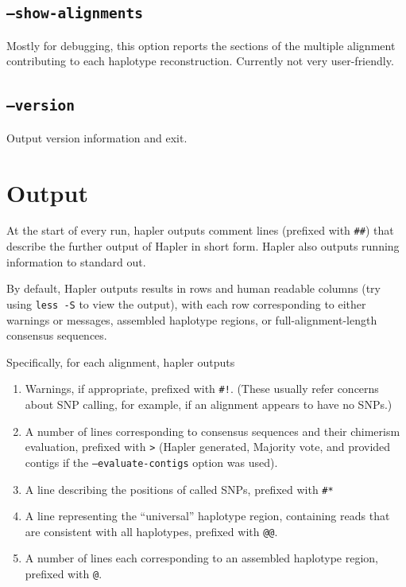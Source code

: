 \documentclass[11pt]{llncs}
\begin{document}
\subsection{\texttt{--show-alignments}}

Mostly for debugging, this option reports the sections of the multiple alignment contributing to each haplotype reconstruction. Currently
not very user-friendly.


\subsection{\texttt{--version}}

Output version information and exit.

\newpage


\section{Output}
\label{output}

At the start of every run, hapler outputs comment lines (prefixed with \texttt{\#\#}) that describe the further output of Hapler in short form. Hapler
also outputs running information to standard out.

By default, Hapler outputs results in rows and human readable columns (try using \texttt{less -S} to view the output), with each row 
corresponding to either warnings or messages, assembled haplotype regions, or full-alignment-length consensus sequences. 

Specifically, for each alignment, hapler outputs 

\begin{enumerate}
\item Warnings, if appropriate, prefixed with \texttt{\#!}. (These usually refer concerns about SNP calling, for example, if an alignment appears to have no SNPs.)
\item A number of lines corresponding to consensus sequences and their chimerism evaluation, prefixed with \texttt{>} (Hapler generated, Majority vote, and provided contigs if the \texttt{--evaluate-contigs} option was used).
\item A line describing the positions of called SNPs, prefixed with \verb=#*=
\item A line representing the ``universal'' haplotype region, containing reads that are consistent with all haplotypes, prefixed with \texttt{@@}.
\item A number of lines each corresponding to an assembled haplotype region, prefixed with \texttt{@}. 
\end{enumerate}
\end{document}
